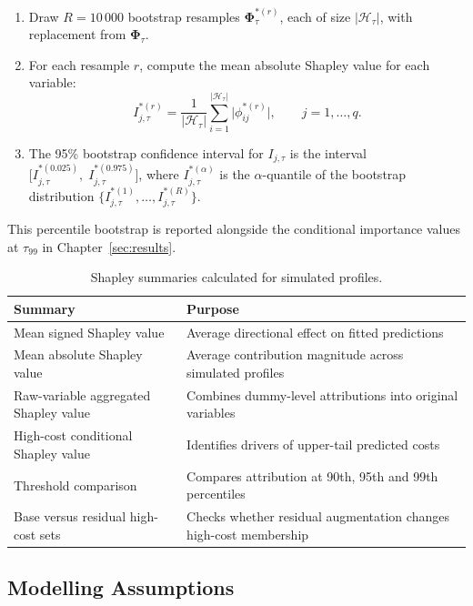 \begin{enumerate}
    \item Draw $R = 10\,000$ bootstrap resamples $\boldsymbol{\Phi}_{\tau}^{*(r)}$, each of size $|\mathcal{H}_{\tau}|$, with replacement from $\boldsymbol{\Phi}_{\tau}$.
    \item For each resample $r$, compute the mean absolute Shapley value for each variable:
    \[
        I_{j,\tau}^{*(r)} = \frac{1}{|\mathcal{H}_{\tau}|} \sum_{i=1}^{|\mathcal{H}_{\tau}|} \bigl|\phi_{ij}^{*(r)}\bigr|, \qquad j = 1, \ldots, q.
    \]
    \item The 95\% bootstrap confidence interval for $I_{j,\tau}$ is the interval $\bigl[I_{j,\tau}^{*(0.025)},\; I_{j,\tau}^{*(0.975)}\bigr]$, where $I_{j,\tau}^{*(\alpha)}$ is the $\alpha$-quantile of the bootstrap distribution $\{I_{j,\tau}^{*(1)}, \ldots, I_{j,\tau}^{*(R)}\}$.
\end{enumerate}

This percentile bootstrap is reported alongside the conditional importance values at $\tau_{99}$ in Chapter~\ref{sec:results}.

\begin{table}[H]
\centering
\small
\renewcommand{\arraystretch}{1.15}
\begin{tabular}{p{}p{}}
\toprule
\textbf{Summary} & \textbf{Purpose} \\
\midrule
Mean signed Shapley value & Average directional effect on fitted predictions \\
Mean absolute Shapley value & Average contribution magnitude across simulated profiles \\
Raw-variable aggregated Shapley value & Combines dummy-level attributions into original variables \\
High-cost conditional Shapley value & Identifies drivers of upper-tail predicted costs \\
Threshold comparison & Compares attribution at 90th, 95th and 99th percentiles \\
Base versus residual high-cost sets & Checks whether residual augmentation changes high-cost membership \\
\bottomrule
\end{tabular}
\caption{Shapley summaries calculated for simulated profiles.}
\label{tab:shap_summaries_ch3}
\end{table}


\subsection{Modelling Assumptions}
\label{sec:modelling_assumptions}

